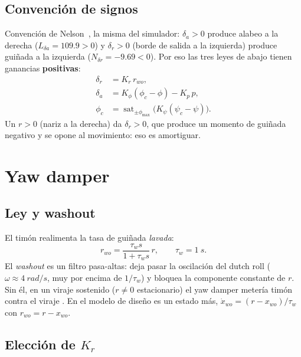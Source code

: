 \documentclass[11pt,a4paper]{article}
\begin{document}
\subsection{Convención de signos}

Convención de Nelson~\cite{nelson}, la misma del simulador:
$\delta_a > 0$ produce alabeo a la derecha ($L_{\delta a} = 109.9 > 0$) y
$\delta_r > 0$ (borde de salida a la izquierda) produce guiñada a la izquierda
($N_{\delta r} = -9.69 < 0$). Por eso las tres leyes de abajo tienen ganancias
\textbf{positivas}:
\begin{align}
  \delta_r &= K_r\, r_{wo}, \label{eq:yd}\\
  \delta_a &= K_\phi(\phi_c - \phi) - K_p\, p, \label{eq:roll}\\
  \phi_c   &= \operatorname{sat}_{\pm\phi_{\max}}\!\bigl(K_\psi(\psi_c - \psi)\bigr). \label{eq:hdg}
\end{align}
Un $r > 0$ (nariz a la derecha) da $\delta_r > 0$, que produce un momento de
guiñada negativo y se opone al movimiento: eso es amortiguar.

\section{Yaw damper}
\label{sec:yd}

\subsection{Ley y washout}

El timón realimenta la tasa de guiñada \emph{lavada}:
\begin{equation}
  r_{wo} = \frac{\tau_w s}{1 + \tau_w s}\, r,
  \qquad \tau_w = \SI{1}{s}.
\end{equation}
El \emph{washout} es un filtro pasa-altas: deja pasar la oscilación del dutch
roll ($\omega \approx \SI{4}{rad/s}$, muy por encima de $1/\tau_w$) y bloquea
la componente constante de $r$. Sin él, en un viraje sostenido
($r \ne 0$ estacionario) el yaw damper metería timón contra el viraje
\cite{stevens}. En el modelo de diseño es un estado más,
$\dot x_{wo} = (r - x_{wo})/\tau_w$ con $r_{wo} = r - x_{wo}$.

\subsection{Elección de \texorpdfstring{$K_r$}{Kr}}
\end{document}
